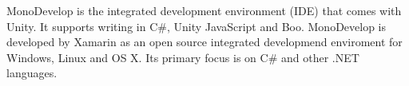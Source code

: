 MonoDevelop is the integrated development environment (IDE) that comes with Unity. It supports writing in C\#, Unity JavaScript and Boo.
MonoDevelop is developed by Xamarin \cite{xamarinRef} as an open source integrated developmend enviroment for Windows, Linux and OS X.
Its primary focus is on C\# and other .NET languages.


